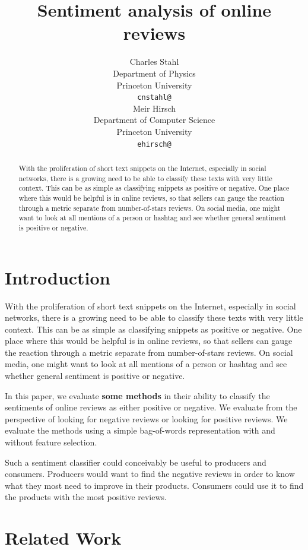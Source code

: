 \documentclass{article} %
\title{Sentiment analysis of online reviews}
\author{
	Charles Stahl\\
	Department of Physics\\
	Princeton University\\
	\texttt{cnstahl@} \\
	\And
	Meir Hirsch \\
	Department of Computer Science\\
	Princeton University \\
	\texttt{ehirsch@} \\
}
\begin{document}
	
	\maketitle
	
	\begin{abstract}
		With the proliferation of short text snippets on the Internet, especially in social networks, there is a growing need to be able to classify these texts with very little context. This can be as simple as classifying snippets as positive or negative. One place where this would be helpful is in online reviews, so that sellers can gauge the reaction through a metric separate from number-of-stars reviews. On social media, one might want to look at all mentions of a person or hashtag and see whether general sentiment is positive or negative.
	\end{abstract}
	
	\section{Introduction}
	
	With the proliferation of short text snippets on the Internet, especially in social networks, there is a growing need to be able to classify these texts with very little context. This can be as simple as classifying snippets as positive or negative. One place where this would be helpful is in online reviews, so that sellers can gauge the reaction through a metric separate from number-of-stars reviews. On social media, one might want to look at all mentions of a person or hashtag and see whether general sentiment is positive or negative.
	
	In this paper, we evaluate {\bf some methods} in their ability to classify the sentiments of online reviews as either positive or negative. We evaluate from the perspective of looking for negative reviews or looking for positive reviews. We evaluate the methods using a simple bag-of-words representation with and without feature selection. 
	
	Such a sentiment classifier could conceivably be useful to producers and consumers. Producers would want to find the negative reviews in order to know what they most need to improve in their products. Consumers could use it to find the products with the most positive reviews.
	
	\section{Related Work}
	
\end{document}
